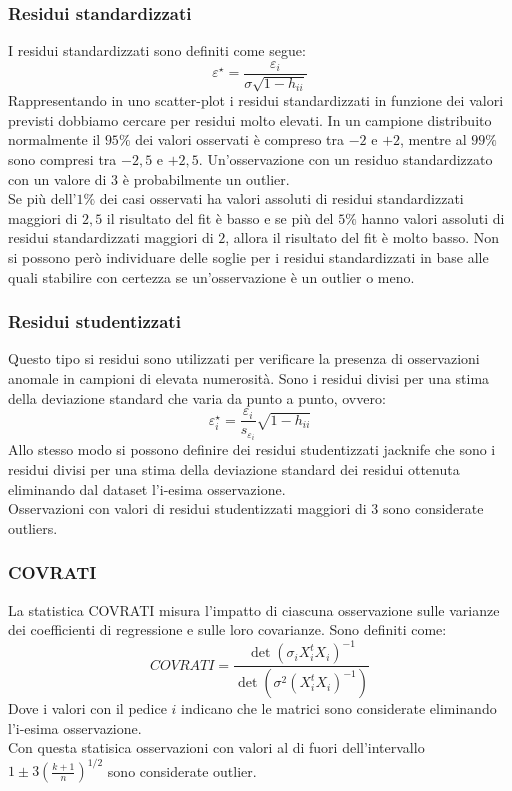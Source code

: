 \subsubsection{Residui standardizzati}
I residui standardizzati sono definiti come segue:
\begin{equation}
\varepsilon^\star = \frac{\varepsilon_i}{\sigma \sqrt{1-h_{ii}}}
\end{equation}
Rappresentando in uno scatter-plot i residui standardizzati in funzione dei valori previsti dobbiamo cercare per residui molto elevati. In un campione distribuito normalmente il $95\%$ dei valori osservati è compreso tra $-2$ e $+2$, mentre al $99\%$ sono compresi tra $-2,5$ e $+2,5$. Un'osservazione con un residuo standardizzato con un valore di $3$ è probabilmente un outlier.\\
Se più dell’$1\%$ dei casi osservati ha valori assoluti di residui standardizzati maggiori di $2,5$ il risultato del fit è basso e se più del $5\%$ hanno valori assoluti di residui standardizzati maggiori di $2$, allora il risultato del fit è molto basso. Non si possono però individuare delle soglie per i residui standardizzati in base alle quali stabilire con certezza se un'osservazione è un outlier o meno.

\subsubsection{Residui studentizzati}
Questo tipo si residui sono utilizzati per verificare la presenza di osservazioni anomale in campioni di elevata numerosità. Sono i residui divisi per una stima della deviazione standard che varia da punto a punto, ovvero:
\begin{equation}
\varepsilon_i^\star = \frac{\varepsilon_i}{s_{\varepsilon_i}} \sqrt{1-h_{ii}}
\end{equation}
Allo stesso modo si possono definire dei residui studentizzati jacknife che sono i residui divisi per una stima della deviazione standard dei residui ottenuta eliminando dal dataset l'i-esima osservazione.\\
Osservazioni con valori di residui studentizzati maggiori di 3 sono considerate outliers.

\subsubsection{COVRATI}
La statistica COVRATI misura l'impatto di ciascuna osservazione sulle varianze dei coefficienti di regressione e sulle loro covarianze. Sono definiti come:
\begin{equation}
COVRATI = \frac{\det(\sigma_i X_i^t X_i)^{-1}}{\det(\sigma^2(X_i^t X_i)^{-1})}
\end{equation}
Dove i valori con il pedice $i$ indicano che le matrici sono considerate eliminando l'i-esima osservazione.\\
Con questa statisica osservazioni con valori al di fuori dell'intervallo $1 \pm 3(\frac{k+1}{n})^{1/2}$ sono considerate outlier.

